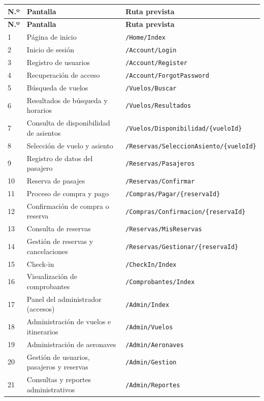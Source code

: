 \documentclass[11pt,a4paper]{article}
\begin{document}
\small
\begin{longtable}{@{}p{.75cm}p{6.4cm}p{7cm}@{}}
\toprule
\textbf{N.º} & \textbf{Pantalla} & \textbf{Ruta prevista}\\\midrule\endfirsthead
\toprule\textbf{N.º}&\textbf{Pantalla}&\textbf{Ruta prevista}\\\midrule\endhead
1 & Página de inicio & \texttt{/Home/Index} \\
2 & Inicio de sesión & \texttt{/Account/Login} \\
3 & Registro de usuarios & \texttt{/Account/Register} \\
4 & Recuperación de acceso & \texttt{/Account/ForgotPassword} \\
5 & Búsqueda de vuelos & \texttt{/Vuelos/Buscar} \\
6 & Resultados de búsqueda y horarios & \texttt{/Vuelos/Resultados} \\
7 & Consulta de disponibilidad de asientos & \texttt{/Vuelos/Disponibilidad/\{vueloId\}} \\
8 & Selección de vuelo y asiento & \texttt{/Reservas/SeleccionAsiento/\{vueloId\}} \\
9 & Registro de datos del pasajero & \texttt{/Reservas/Pasajeros} \\
10 & Reserva de pasajes & \texttt{/Reservas/Confirmar} \\
11 & Proceso de compra y pago & \texttt{/Compras/Pagar/\{reservaId\}} \\
12 & Confirmación de compra o reserva & \texttt{/Compras/Confirmacion/\{reservaId\}} \\
13 & Consulta de reservas & \texttt{/Reservas/MisReservas} \\
14 & Gestión de reservas y cancelaciones & \texttt{/Reservas/Gestionar/\{reservaId\}} \\
15 & Check-in & \texttt{/CheckIn/Index} \\
16 & Visualización de comprobantes & \texttt{/Comprobantes/Index} \\
17 & Panel del administrador (accesos) & \texttt{/Admin/Index} \\
18 & Administración de vuelos e itinerarios & \texttt{/Admin/Vuelos} \\
19 & Administración de aeronaves & \texttt{/Admin/Aeronaves} \\
20 & Gestión de usuarios, pasajeros y reservas & \texttt{/Admin/Gestion} \\
21 & Consultas y reportes administrativos & \texttt{/Admin/Reportes} \\
\bottomrule
\end{longtable}
\normalsize
\end{document}
